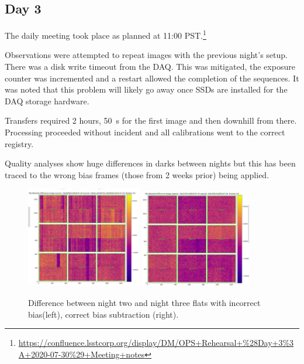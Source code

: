 \subsection{Day 3} \label{sec:day3}

The daily meeting took place as planned at 11:00 PST.\footnote{\url{https://confluence.lsstcorp.org/display/DM/OPS+Rehearsal+\%28Day+3\%3A+2020-07-30\%29+Meeting+notes}}

Observations were attempted to repeat images with the previous night's setup.  There was a
disk write timeout from the DAQ.  This was mitigated, the exposure counter was incremented
and a restart allowed the completion of the sequences.  It was noted that this
problem will likely go away once SSDs are installed for the DAQ storage hardware.

Transfers required 2 hours, 50~s for the first image and then downhill from there.
Processing proceeded without incident and all calibrations went to the correct
registry.

Quality analyses show huge differences in darks between nights but this has been
traced to the wrong bias frames (those from 2 weeks prior) being applied.


\begin{figure}
\includegraphics[width=0.45\textwidth]{figures/n3-2bad}
\includegraphics[width=0.43\textwidth]{figures/n3-2}
	\caption{Difference between night two and night three flats with incorrect bias(left),  correct bias subtraction (right).\label{fig:d3}}
\end{figure}


